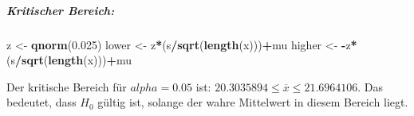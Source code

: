 \documentclass[]{article}
\newenvironment{Shaded}{\begin{snugshade}}{\end{snugshade}}
\newcommand{\KeywordTok}[1]{\textcolor[rgb]{0.13,0.29,0.53}{\textbf{#1}}}
\newcommand{\FloatTok}[1]{\textcolor[rgb]{0.00,0.00,0.81}{#1}}
\newcommand{\StringTok}[1]{\textcolor[rgb]{0.31,0.60,0.02}{#1}}
\newcommand{\OperatorTok}[1]{\textcolor[rgb]{0.81,0.36,0.00}{\textbf{#1}}}
\newcommand{\NormalTok}[1]{#1}
\let\oldsubparagraph\subparagraph
\renewcommand{\subparagraph}[1]{\oldsubparagraph{#1}\mbox{}}
\begin{document}
\subparagraph{Kritischer Bereich:}\label{kritischer-bereich}

\begin{Shaded}
\begin{Highlighting}[]
\NormalTok{z <-}\StringTok{ }\KeywordTok{qnorm}\NormalTok{(}\FloatTok{0.025}\NormalTok{)}
\NormalTok{lower <-}\StringTok{ }\NormalTok{z}\OperatorTok{*}\NormalTok{(s}\OperatorTok{/}\KeywordTok{sqrt}\NormalTok{(}\KeywordTok{length}\NormalTok{(x)))}\OperatorTok{+}\NormalTok{mu}
\NormalTok{higher <-}\StringTok{ }\OperatorTok{-}\NormalTok{z}\OperatorTok{*}\NormalTok{(s}\OperatorTok{/}\KeywordTok{sqrt}\NormalTok{(}\KeywordTok{length}\NormalTok{(x)))}\OperatorTok{+}\NormalTok{mu}
\end{Highlighting}
\end{Shaded}

Der kritische Bereich für \(alpha = 0.05\) ist:
\(20.3035894 \leq \overline{x} \leq 21.6964106\). Das bedeutet, dass
\(H_0\) gültig ist, solange der wahre Mittelwert in diesem Bereich
liegt.
\end{document}
